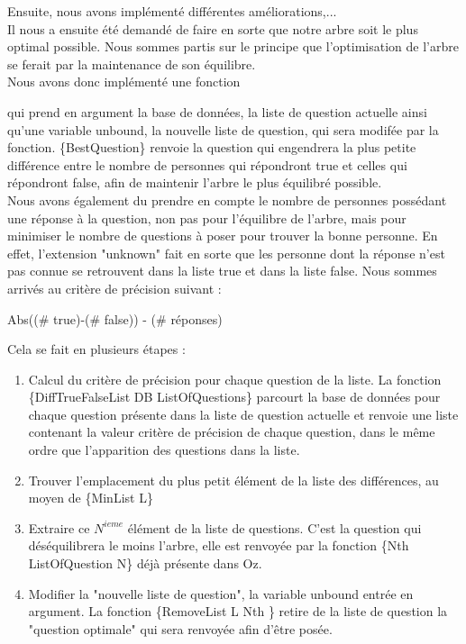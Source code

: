 \documentclass[12pt]{article}
\begin{document}
Ensuite, nous avons implémenté différentes améliorations,... \\

Il nous a ensuite été demandé de faire en sorte que notre arbre soit le plus optimal possible. Nous sommes partis sur le principe que l'optimisation de l'arbre se ferait par la maintenance de son équilibre.\\
Nous avons donc implémenté une fonction { qui prend en argument la base de données, la liste de question actuelle ainsi qu'une variable unbound, la nouvelle liste de question, qui sera modifée par la fonction. {\selectfont \{BestQuestion\}} renvoie la question qui engendrera la plus petite différence entre le nombre de personnes qui répondront true et celles qui répondront false, afin de maintenir l'arbre le plus équilibré possible.\\
Nous avons également du prendre en compte le nombre de personnes possédant une réponse à la question, non pas pour l'équilibre de l'arbre, mais pour minimiser le nombre de questions à poser pour trouver la bonne personne. En effet, l'extension "unknown" fait en sorte que les personne dont la réponse n'est pas connue se retrouvent dans la liste true et dans la liste false. Nous sommes arrivés au critère de précision suivant : \\

\begin{center}
Abs((\# true)-(\# false)) - (\# réponses)
\end{center}

 
Cela se fait en plusieurs étapes :
\begin{enumerate}
\item Calcul du critère de précision pour chaque question de la liste. La fonction {\selectfont \{DiffTrueFalseList DB ListOfQuestions\}} parcourt la base de données pour chaque question présente dans la liste de question actuelle et renvoie une liste contenant la valeur critère de précision de chaque question, dans le même ordre que l'apparition des questions dans la liste.
\item Trouver l'emplacement du plus petit élément de la liste des différences, au moyen de {\selectfont \{MinList L\}}
\item Extraire ce $N^{ieme}$ élément de la liste de questions.
C'est la question qui déséquilibrera le moins l'arbre, elle est renvoyée par la fonction {\selectfont \{Nth ListOfQuestion N\}} déjà présente dans Oz.
\item Modifier la "nouvelle liste de question", la variable unbound entrée en argument. La fonction {\selectfont \{RemoveList L Nth \}} retire de la liste de question la "question optimale" qui sera renvoyée afin d'être posée.
\end{enumerate}



}
\end{document}
